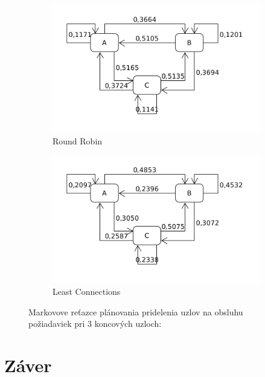 \documentclass[12pt, a4paper]{article}
\begin{document}
\begin{figure}[h!]
	\centering
	\begin{subfigure}[t]{.48\textwidth}
  		\centering
  		\includegraphics[width=\textwidth]{images/10000-3-RR.png}
  		\caption{Round Robin}
	\end{subfigure}
	\begin{subfigure}[t]{.48\textwidth}
  		\centering
  		\includegraphics[width=\textwidth]{images/10000-3-LC.png}
  		\caption{Least Connections}
	\end{subfigure}
	\caption{Markovove reťazce plánovania pridelenia uzlov na obsluhu požiadaviek
	pri 3 koncových uzloch: \usebox{\shield}
	}
\end{figure}





\section{Záver}

\newpage
{}
\printbibliography[title={Literatúra}]
\end{document}
